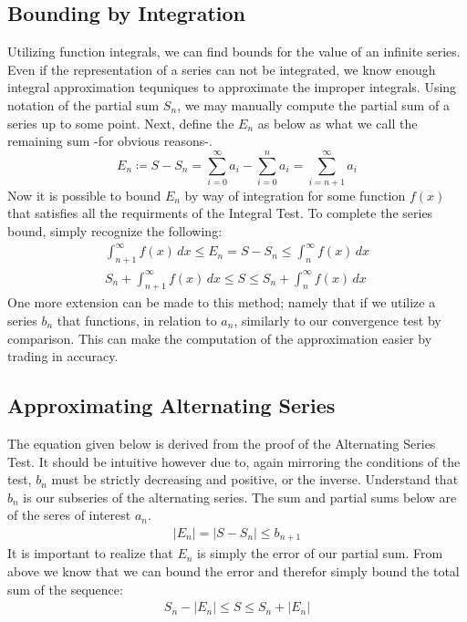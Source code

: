 \documentclass[11pt]{scrreprt}
\newcommand{\define}{\coloneqq}
\newcommand{\abs}[1]{\left| #1 \right|}
\begin{document}
	\subsection*{Bounding by Integration}
		Utilizing function integrals, we can find bounds for the value of an infinite series. Even if the representation of a series can not
		be integrated, we know enough integral approximation tequniques to approximate the improper integrals. Using notation of the 
		partial sum $S_n$, we may manually compute the partial sum of a series up to some point. Next, define the $E_n$ as below as what
		we call the remaining sum -for obvious reasons-.
			\begin{equation}
				E_n \define S - S_n = \sum_{i = 0}^{\infty} a_i - \sum_{i = 0}^{n} a_i = \sum_{i = n + 1}^{\infty} a_i
			\end{equation}
		Now it is possible to bound $E_n$ by way of integration for some function $f(x)$ that satisfies all the requirments of the Integral Test.
		To complete the series bound, simply recognize the following:
			\begin{align}
				\int_{n + 1}^{\infty} f(x) \, dx \leq E_n = S - S_n \leq \int_{n}^{\infty} f(x) \, dx\\
				S_n + \int_{n + 1}^{\infty} f(x) \, dx \leq S \leq S_n + \int_{n}^{\infty} f(x) \, dx
			\end{align}
		One more extension can be made to this method; namely that if we utilize a series $b_n$ that functions, in relation to $a_n$, similarly
		to our convergence test by comparison. This can make the computation of the approximation easier by trading in accuracy.

	\subsection*{Approximating Alternating Series}
		The equation given below is derived from the proof of the Alternating Series Test. It should be intuitive however due to, again mirroring
		the conditions of the test, $b_n$ must be strictly decreasing and positive, or the inverse. Understand that $b_n$ is our subseries of
		the alternating series. The sum and partial sums below are of the seres of interest $a_n$.
			\begin{align}
				\abs{E_n} = \abs{S - S_n} \leq b_{n + 1}
			\end{align}
		It is important to realize that $E_n$ is simply the error of our partial sum. From above we know that we can bound the error and therefor
		simply bound the total sum of the sequence:
			\begin{align}
				S_n - \abs{E_n} \leq S \leq S_n + \abs{E_n}
			\end{align}
\end{document}
